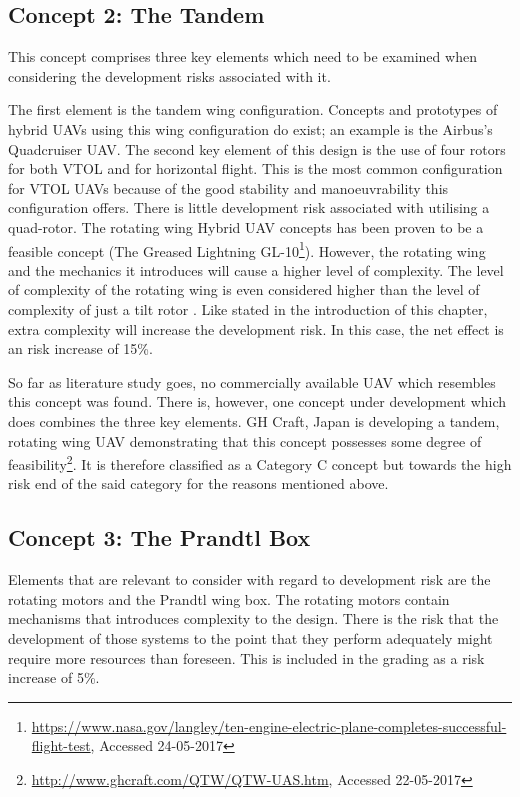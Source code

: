 \subsection{Concept 2: The Tandem}
This concept comprises three key elements which need to be examined when considering the development risks associated with it. 

The first element is the tandem wing configuration. Concepts and prototypes of hybrid UAVs using this wing configuration do exist; an example is the Airbus’s Quadcruiser UAV.  The second key element of this design is the use of four rotors for both VTOL and for horizontal flight. This is the most common configuration for VTOL UAVs because of the good stability and manoeuvrability this configuration offers. There is little development risk associated with utilising a quad-rotor.
The rotating wing Hybrid UAV concepts has been proven to be a feasible concept (The Greased Lightning GL-10\footnote{\url{https://www.nasa.gov/langley/ten-engine-electric-plane-completes-successful-flight-test}, Accessed 24-05-2017}). However, the rotating wing and the mechanics it introduces will cause a higher level of complexity. The level of complexity of the rotating wing is even considered higher than the level of complexity of just a tilt rotor \cite{princeton}. Like stated in the introduction of this chapter, extra complexity will increase the development risk. In this case, the net effect is an risk increase of 15\%.

So far as literature study goes, no commercially available UAV which resembles this concept was found. There is, however, one concept under development which does combines the three key elements. GH Craft, Japan is developing a tandem, rotating wing UAV demonstrating that this concept possesses some degree of feasibility\footnote{\url{http://www.ghcraft.com/QTW/QTW-UAS.htm}, Accessed 22-05-2017}. It is therefore classified as a Category C concept but towards the high risk end of the said category for the reasons mentioned above.

\subsection{Concept 3: The Prandtl Box}
Elements that are relevant to consider with regard to development risk are the rotating motors and the Prandtl wing box. The rotating motors contain mechanisms that introduces complexity to the design. There is the risk that the development of those systems to the point that they perform adequately might require more resources than foreseen. This is included in the grading as a risk increase of 5\%.


